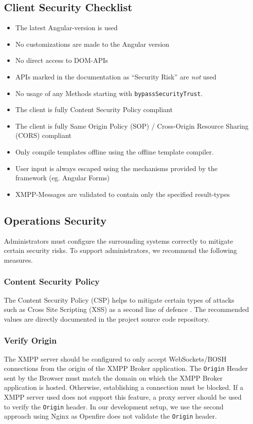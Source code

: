 \subsection{Client Security Checklist}
\begin{itemize}
    \item The latest Angular-version is used
    \item No customizations are made to the Angular version
    \item No direct access to DOM-APIs
    \item APIs marked in the documentation as ``Security Risk'' are \emph{not} used
    \item No usage of any Methods starting with \texttt{bypassSecurityTrust}.
    \item The client is fully Content Security Policy compliant
    \item The client is fully Same Origin Policy (SOP) / Cross-Origin Resource Sharing (CORS) compliant
    \item Only compile templates offline using the offline template compiler.
    \item User input is always escaped using the mechanisms provided by the framework (eg. Angular Forms)
    \item XMPP-Messages are validated to contain only the specified result-types
\end{itemize}

\subsection{Operations Security}


Administrators must configure the surrounding systems correctly to mitigate certain security risks.
To support administrators, we recommend the following measures.

\subsubsection{Content Security Policy}

The Content Security Policy (CSP) helps to mitigate certain types of attacks such as Cross Site Scripting (XSS) as a second line of defence \cite{w3c-csp}.
The recommended values are directly documented in the project source code repository.

\subsubsection{Verify Origin}
The XMPP server should be configured to only accept WebSockets/BOSH connections from the origin of the XMPP Broker application.
The \texttt{Origin} Header sent by the Browser must match the domain on which the XMPP Broker application is hosted.
Otherwise,  establishing a connection must be blocked.
If a XMPP server used does not support this feature, a proxy server should be used to verify the \texttt{Origin} header.
In our development setup, we use the second approach using Nginx as Openfire does not validate the \texttt{Origin} header.
